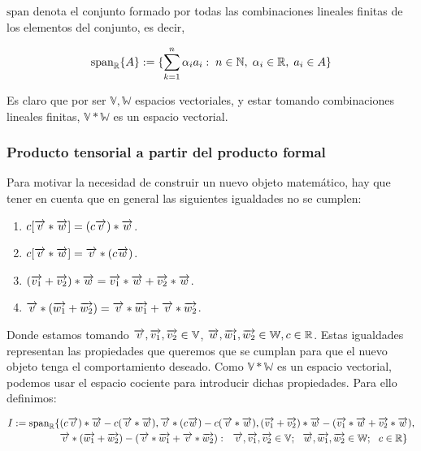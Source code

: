 \begin{observacion}
	$\text{span}$ denota el conjunto formado por todas las combinaciones lineales finitas de los elementos del conjunto, es decir,

	\begin{equation}
		\text{span}_{\mathbb{R}} \{ A \} := \{ \sum_{k = 1}^n \alpha_i a_i : \; n \in \mathbb{N}, \; \alpha_i \in \mathbb{R}, \; a_i \in A \}
	\end{equation}
\end{observacion}

Es claro que por ser $\mathbb{V}, \mathbb{W}$ espacios vectoriales, y estar tomando combinaciones lineales finitas, $\mathbb{V} \ast \mathbb{W}$ es un espacio vectorial.

\subsubsection{Producto tensorial a partir del producto formal} \label{sec:cociente_prod_formal}

Para motivar la necesidad de construir un nuevo objeto matemático, hay que tener en cuenta que en general las siguientes igualdades no se cumplen:

\begin{enumerate}
	\item $c [\overrightarrow{v} \ast \overrightarrow{w}] = (c\overrightarrow{v}) \ast \overrightarrow{w}$.
	\item $c[\overrightarrow{v} \ast \overrightarrow{w}] = \overrightarrow{v} \ast (c\overrightarrow{w})$.
	\item $(\overrightarrow{v_1} + \overrightarrow{v_2}) \ast \overrightarrow{w} = \overrightarrow{v_1} \ast \overrightarrow{w} + \overrightarrow{v_2} \ast \overrightarrow{w}$.
	\item $\overrightarrow{v} \ast (\overrightarrow{w_1} + \overrightarrow{w_2}) = \overrightarrow{v} \ast \overrightarrow{w_1} + \overrightarrow{v} \ast \overrightarrow{w_2}$.
\end{enumerate}

Donde estamos tomando $\overrightarrow{v}, \overrightarrow{v_1}, \overrightarrow{v_2} \in \mathbb{V}$, $\overrightarrow{w}, \overrightarrow{w_1}, \overrightarrow{w_2} \in \mathbb{W}, c \in \mathbb{R}$. Estas igualdades representan las propiedades que queremos que se cumplan para que el nuevo objeto tenga el comportamiento deseado. Como $\mathbb{V} \ast \mathbb{W}$ es un espacio vectorial, podemos usar el espacio cociente para introducir dichas propiedades. Para ello definimos:

\begin{equation}
	\begin{split}
		I := \text{span}_{\mathbb{R}} \{  &
			(c\overrightarrow{v}) \ast \overrightarrow{w} - c(\overrightarrow{v} \ast \overrightarrow{w}), \overrightarrow{v} \ast (c\overrightarrow{w}) - c(\overrightarrow{v} \ast \overrightarrow{w}), (\overrightarrow{v_1} + \overrightarrow{v_2}) \ast \overrightarrow{w} - (\overrightarrow{v_1} \ast \overrightarrow{w} + \overrightarrow{v_2} \ast \overrightarrow{w}), \\
			& \overrightarrow{v} \ast (\overrightarrow{w_1} + \overrightarrow{w_2}) - (\overrightarrow{v} \ast \overrightarrow{w_1} + \overrightarrow{v} \ast \overrightarrow{w_2}): \ \  \overrightarrow{v}, \overrightarrow{v_1}, \overrightarrow{v_2} \in \mathbb{V}; \ \  \overrightarrow{w}, \overrightarrow{w_1}, \overrightarrow{w_2} \in \mathbb{W}; \ \  c \in \mathbb{R}  \}
	\end{split}
\end{equation}

